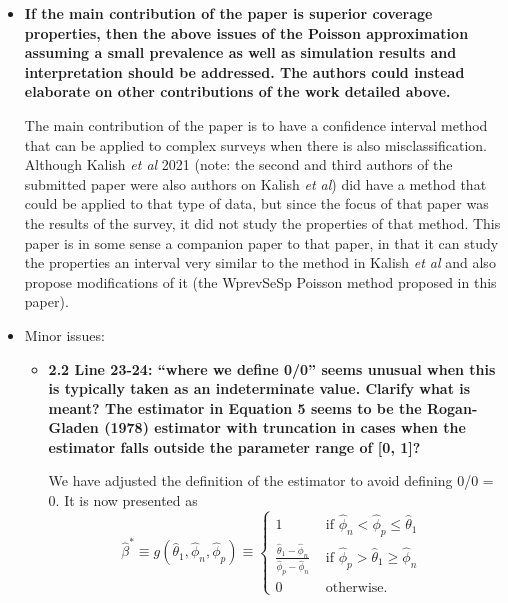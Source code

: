 \documentclass[11pt]{article}
\begin{document}
\begin{itemize}
    \item \textbf{If the main contribution of the paper is superior coverage properties, then the above issues of the Poisson approximation assuming a small prevalence as well as simulation results and interpretation should be addressed. The authors could instead elaborate on other contributions of the work detailed above.}
    
    The main contribution of the paper is to have a confidence interval method that can be applied to complex surveys when there is also misclassification.
    Although Kalish {\it et al} 2021 (note: the second and third authors of the submitted paper were also authors on Kalish {\it et al}) did have a method that could be applied to that type of data, but since the focus of that paper was the results of the survey, it did not study the properties of that method.
    This paper is in some sense a companion paper to that paper, in that it can study the properties an interval very similar to
     the method in Kalish {\it et al} and also propose modifications of it (the WprevSeSp Poisson method proposed in this paper). 
    

    \item Minor issues:
    
    \begin{itemize}
        \item \textbf{2.2 Line 23-24: “where we define 0/0” seems unusual when this is typically taken as an indeterminate value. Clarify what is meant? The estimator in Equation 5 seems to be the Rogan-Gladen (1978) estimator with truncation in cases when the estimator falls outside the parameter range of [0, 1]?}
        
        We have adjusted the definition of the estimator to avoid defining 0/0 = 0. It is now presented as
        \begin{equation}
        \hat{\beta}^* \equiv 
        g(\hat{\theta}_1, \hat{\phi}_n, \hat{\phi}_p)
        \equiv 
        \left\{ 
        \begin{array}{ll}
        1 & \mbox{ if $\hat{\phi}_n < \hat{\phi}_p \leq \hat{\theta}_1$ }  \\
        \frac{\hat{\theta}_1 - \hat{\phi}_n}{\hat{\phi}_p - \hat{\phi}_n} & 
        \mbox{ if $\hat{\phi}_p > \hat{\theta}_1 \geq \hat{\phi}_n$ } \\
        0 & \mbox{ otherwise.} 
        \end{array}
        \right.
        \end{equation}


\end{itemize}
\end{itemize}
\end{document}
